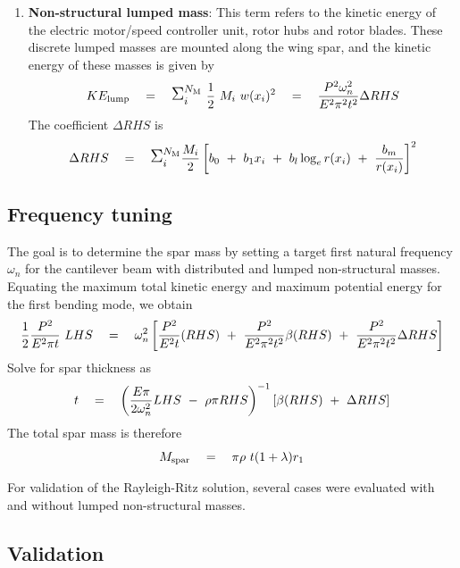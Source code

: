 \begin{enumerate}
\item \textbf{Non-structural lumped mass}: This term refers to the kinetic energy of the electric motor/speed controller unit, rotor hubs and rotor blades. These discrete lumped masses are mounted along the wing spar, and the kinetic energy of these masses is given by 
\begin{equation*}
KE_{\rm lump} \quad = \quad \mathlarger{\mathlarger{\Sigma}}_i^{N_{\rm M}}\spc \frac{1}{2} \spc M_i \spc w(x_i)^2 \quad = \quad \frac{P^2 \omega_n^2}{E^2 \pi^2 t^2} \Delta RHS
\end{equation*}
The coefficient $\Delta RHS$ is 
\begin{equation*}
\Delta RHS \quad = \quad \mathlarger{\mathlarger{\Sigma}}_i^{N_{\rm M}} \frac{M_i}{2} \left[b_0 \spc + \spc b_1 x_i \spc + \spc b_l \log_e r(x_i) \spc + \spc \frac{b_m}{r(x_i)} \right]^2 
\end{equation*}
\end{enumerate}
\subsection{Frequency tuning}
The goal is to determine the spar mass by setting a target first natural frequency $\omega_n$ for the cantilever beam with distributed and lumped non-structural masses. Equating the maximum total kinetic energy and maximum potential energy for the first bending mode, we obtain
\begin{equation}
\frac{1}{2} \frac{P^2}{E^2 \pi t} \textrm{ } LHS \quad = \quad \omega_n^2 \left[\frac{P^2}{E^2 t} (RHS) \textrm{ } + \textrm{ } \frac{P^2}{E^2 \pi^2 t^2} \beta (RHS) \textrm{ } + \textrm{ } \frac{P^2}{E^2 \pi^2 t^2} \Delta RHS \right]
\end{equation}
Solve for spar thickness as 
\begin{equation*}
t \quad = \quad \left(\frac{E \pi}{2 \omega_n^2} LHS \textrm{ } - \textrm{ } \rho \pi RHS \right)^{-1} \left[\beta (RHS) \textrm{ } + \textrm{ } \Delta RHS \right]
\end{equation*}
The total spar mass is therefore 
\begin{equation}
M_{\rm spar} \quad = \quad \pi \rho \textrm{ } t (1 + \lambda) r_1 
\end{equation}

For validation of the Rayleigh-Ritz solution, several cases were evaluated with and without lumped non-structural masses. 

\subsection{Validation}
